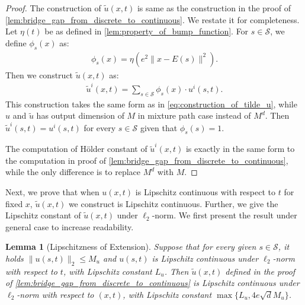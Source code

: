 \documentclass[12pt]{article}
\numberwithin{equation}{section}
\let\tilde\widetilde
\newcommand{\wt}{\widetilde}
\renewcommand{\tilde}{\wt}
\theoremstyle{theoremstyle}
\newtheorem{lemma}{Lemma}[section]
\numberwithin{equation}{section}
\numberwithin{theorem}{section}
\numberwithin{proposition}{section}
\numberwithin{definition}{section}
\numberwithin{lemma}{section}
\numberwithin{assumption}{section}
\numberwithin{remark}{section}
\begin{document}
\begin{proof}
The construction of $\tilde{u}(x,t)$ is same as the construction in the proof of \cref{lem:bridge_gap_from_discrete_to_continuous}.
We restate it for completeness.
Let $\eta(t)$ be as defined in \cref{lem:property_of_bump_function}.
For $s\in \mathcal{S}$, we define $\phi_s(x)$ as:
\begin{align*}
    \phi_s(x)=\eta(e^2\|x-E (s)\|^2).
\end{align*}
Then we construct $\tilde{u}(x,t)$ as:
\begin{align}
\label{eq:construction_of_tilde_u_mixture_path}
\tilde{u}^i(x,t)=\sum_{s\in \mathcal{S}} \phi_s(x)\cdot u^i(s,t). 
\end{align}
This construction takes the same form as in \eqref{eq:construction_of_tilde_u}, while $u$ and $\tilde{u}$ has output dimension of $M$ in mixture path case instead of $M^d$.
Then $\tilde{u}^i(s,t)=u^i(s,t)$ for every $s\in \mathcal{S}$ given that $\phi_s(s)=1$.

The  computation of H\"older constant of $\tilde{u}^i(x,t)$ is exactly in the same form to the computation in proof of \cref{lem:bridge_gap_from_discrete_to_continuous}, while the only difference is to replace $M^d$ with $M$.
\end{proof}

Next, we prove that when $u(x,t)$ is Lipschitz continuous with respect to $t$ for fixed $x$, $\tilde{u}(x,t)$ we construct is Lipschitz continuous.
Further, we give the Lipschitz constant of $\tilde{u}(x,t)$ under $\ell_2$-norm.
We first present the result under general case to increase readability.

\begin{lemma}[Lipschitzness of Extension]\label{lem:lipschitz_of_tilde_u}
Suppose that for every given $s\in \mathcal{S}$, it holds $\|u(s,t)\|_2\leq M_u$ and $u(s,t)$ is Lipschitz continuous under $\ell_2$-norm with respect to $t$, with Lipschitz constant $L_u$. 
Then $\tilde{u}(x,t)$ defined in the proof of \cref{lem:bridge_gap_from_discrete_to_continuous} is Lipschitz continuous under $\ell_2$-norm with respect to $(x,t)$, with Lipschitz constant $\max\{L_u,4e\sqrt{d}M_u\}$. 
\end{lemma}
\end{document}
